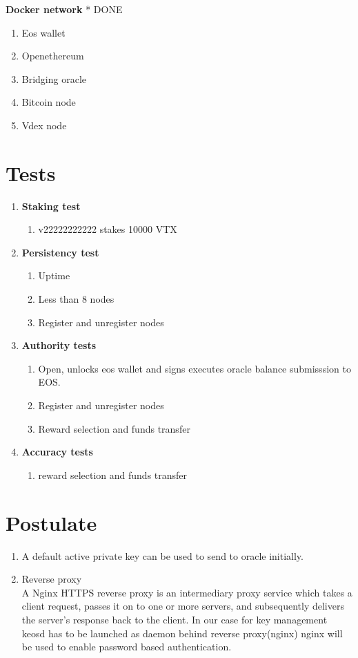 \documentclass[]{article}
\begin{document}
   \textbf{Docker network}	  * {\color{green} DONE}
  \begin{enumerate}
  	\item Eos wallet
  	\item Openethereum
  	\item Bridging oracle
  	\item Bitcoin node
  	\item Vdex node
  \end{enumerate}

\section{Tests}
					\begin{enumerate}
						\item \textbf{Staking test}
						\begin{enumerate}
							\item v22222222222 stakes 10000 VTX
						\end{enumerate}
						\item \textbf{Persistency test}
							\begin{enumerate}
								\item Uptime\textit{}
								\item Less than 8 nodes 
								\item Register and unregister nodes
							\end{enumerate}
						\item \textbf{Authority tests}
							\begin{enumerate}
							\item Open, unlocks eos wallet and signs executes oracle balance submisssion to EOS.
							\item Register and unregister nodes
							\item Reward selection and funds transfer	
						\end{enumerate}
											\item \textbf{Accuracy tests}
													\begin{enumerate}
															\item reward selection and funds transfer	
													\end{enumerate}
				\end{enumerate}
\section{Postulate}
\begin{enumerate}
	\item A default active private key can be used to send to oracle initially.
	\item Reverse proxy \\
	A Nginx HTTPS reverse proxy is an intermediary proxy service which takes a client request, passes it on to one or more servers, and subsequently delivers the server's response back to the client. 
	In our case for key management keosd has to be launched as daemon behind reverse proxy(nginx)
	nginx will be used to enable password based authentication.
\end{enumerate}
\end{document}
